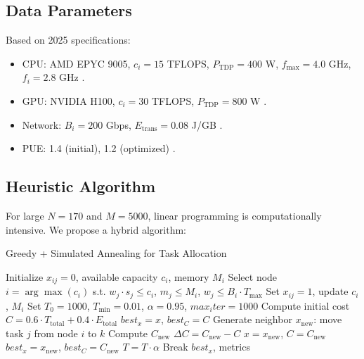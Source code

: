 \documentclass[a4paper,11pt]{article}
\begin{document}
\subsection{Data Parameters}
Based on 2025 specifications:
\begin{itemize}
    \item CPU: AMD EPYC 9005, $c_i = 15$ TFLOPS, $P_{\text{TDP}} = 400$ W, $f_{\text{max}} = 4.0$ GHz, $f_i = 2.8$ GHz \cite{AMD2025}.
    \item GPU: NVIDIA H100, $c_i = 30$ TFLOPS, $P_{\text{TDP}} = 800$ W \cite{NVIDIA2025}.
    \item Network: $B_i = 200$ Gbps, $E_{\text{trans}} = 0.08$ J/GB \cite{CERNNetwork2025}.
    \item PUE: 1.4 (initial), 1.2 (optimized) \cite{CERNDataCenter2025}.
\end{itemize}

\subsection{Heuristic Algorithm}
For large $N=170$ and $M=5000$, linear programming is computationally intensive. We propose a hybrid algorithm:

\begin{algorithm}
\caption{Greedy + Simulated Annealing for Task Allocation}
\begin{algorithmic}
\State Initialize $x_{ij} = 0$, available capacity $c_i$, memory $M_i$
    \State Select node $i = \arg\max(c_i)$ s.t. $w_j \cdot s_j \leq c_i$, $m_j \leq M_i$, $w_j \leq B_i \cdot T_{\text{max}}$
    \State Set $x_{ij} = 1$, update $c_i$, $M_i$
\EndFor
\State Set $T_0 = 1000$, $T_{\text{min}} = 0.01$, $\alpha = 0.95$, $max_iter = 1000$
\State Compute initial cost $C = 0.6 \cdot T_{\text{total}} + 0.4 \cdot E_{\text{total}}$
\State $best_x = x$, $best_C = C$
    \State Generate neighbor $x_{\text{new}}$: move task $j$ from node $i$ to $k$
        \State Compute $C_{\text{new}}$
        \State $\Delta C = C_{\text{new}} - C$
            \State $x = x_{\text{new}}$, $C = C_{\text{new}}$
                \State $best_x = x_{\text{new}}$, $best_C = C_{\text{new}}$
            \EndIf
        \EndIf
    \EndIf
    \State $T = T \cdot \alpha$
        \State Break
    \EndIf
\EndFor
\State \Return $best_x$, metrics
\end{algorithmic}
\end{algorithm}
\end{document}
